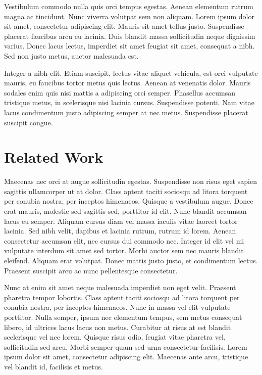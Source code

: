 Vestibulum commodo nulla quis orci tempus egestas. Aenean elementum
rutrum magna ac tincidunt. Nunc viverra volutpat sem non aliquam.
Lorem ipsum dolor sit amet, consectetur adipiscing elit. Mauris sit
amet tellus justo. Suspendisse placerat faucibus arcu eu lacinia.
Duis blandit massa sollicitudin neque dignissim varius. Donec lacus
lectus, imperdiet sit amet feugiat sit amet, consequat a nibh. Sed
non justo metus, auctor malesuada est.

Integer a nibh elit. Etiam suscipit, lectus vitae aliquet vehicula,
est orci vulputate mauris, eu faucibus tortor metus quis lectus. Aenean
at venenatis dolor. Mauris sodales enim quis nisi mattis a adipiscing
orci semper. Phasellus accumsan tristique metus, in scelerisque nisi
lacinia cursus. Suspendisse potenti. Nam vitae lacus condimentum justo
adipiscing semper at nec metus. Suspendisse placerat suscipit congue. 

\section{Related Work}

Maecenas nec orci at augue sollicitudin egestas. Suspendisse non risus
eget sapien sagittis ullamcorper ut at dolor. Class aptent taciti
sociosqu ad litora torquent per conubia nostra, per inceptos himenaeos.
Quisque a vestibulum augue. Donec erat mauris, molestie sed sagittis
sed, porttitor id elit. Nunc blandit accumsan lacus eu semper. Aliquam
cursus diam vel massa iaculis vitae laoreet tortor lacinia. Sed nibh
velit, dapibus et lacinia rutrum, rutrum id lorem. Aenean consectetur
accumsan elit, nec cursus dui commodo nec. Integer id elit vel mi
vulputate interdum sit amet sed tortor. Morbi auctor sem nec mauris
blandit eleifend. Aliquam erat volutpat. Donec mattis justo justo,
et condimentum lectus. Praesent suscipit arcu ac nunc pellentesque
consectetur.

Nunc at enim sit amet neque malesuada imperdiet non eget velit. Praesent
pharetra tempor lobortis. Class aptent taciti sociosqu ad litora torquent
per conubia nostra, per inceptos himenaeos. Nunc in massa vel elit
vulputate porttitor. Nulla semper, ipsum nec elementum tempus, sem
metus consequat libero, id ultrices lacus lacus non metus. Curabitur
at risus at est blandit scelerisque vel nec lorem. Quisque risus odio,
feugiat vitae pharetra vel, sollicitudin sed arcu. Morbi semper quam
sed urna consectetur facilisis. Lorem ipsum dolor sit amet, consectetur
adipiscing elit. Maecenas ante arcu, tristique vel blandit id, facilisis
et metus.

